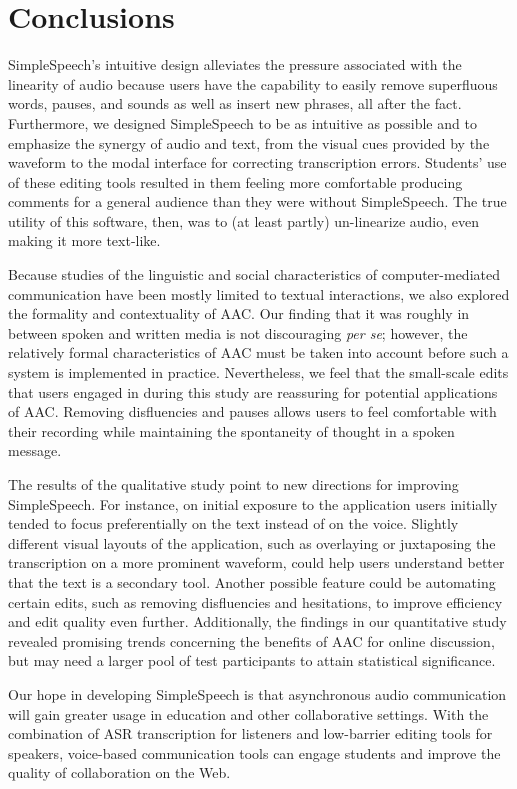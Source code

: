 \section{Conclusions}

SimpleSpeech's intuitive design alleviates the pressure associated with the linearity of audio because users have the capability to easily remove superfluous words, pauses, and sounds as well as insert new phrases, all after the fact.
Furthermore, we designed SimpleSpeech to be as intuitive as possible and to emphasize the synergy of audio and text, from the visual cues provided by the waveform to the modal interface for correcting transcription errors.
Students' use of these editing tools resulted in them feeling more comfortable producing comments for a general audience than they were without SimpleSpeech.
The true utility of this software, then, was to (at least partly) un-linearize audio, even making it more text-like.

Because studies of the linguistic and social characteristics of computer-mediated communication have been mostly limited to textual interactions, we also explored the formality and contextuality of AAC. 
Our finding that it was roughly in between spoken and written media is not discouraging \textit{per se}; however, the relatively formal characteristics of AAC must be taken into account before such a system is implemented in practice.
Nevertheless, we feel that the small-scale edits that users engaged in during this study are reassuring for potential applications of AAC.
Removing disfluencies and pauses allows users to feel comfortable with their recording while maintaining the spontaneity of thought in a spoken message.

The results of the qualitative study point to new directions for improving SimpleSpeech. 
For instance, on initial exposure to the application users initially tended to focus preferentially on the text instead of on the voice.
Slightly different visual layouts of the application, such as overlaying or juxtaposing the transcription on a more prominent waveform, could help users understand better that the text is a secondary tool.
Another possible feature could be automating certain edits, such as removing disfluencies and hesitations, to improve efficiency and edit quality even further.
Additionally, the findings in our quantitative study revealed promising trends concerning the benefits of AAC for online discussion, but may need a larger pool of test participants to attain statistical significance.

Our hope in developing SimpleSpeech is that asynchronous audio communication will gain greater usage in education and other collaborative settings. 
With the combination of ASR transcription for listeners and low-barrier editing tools for speakers, voice-based communication tools can engage students and improve the quality of collaboration on the Web.